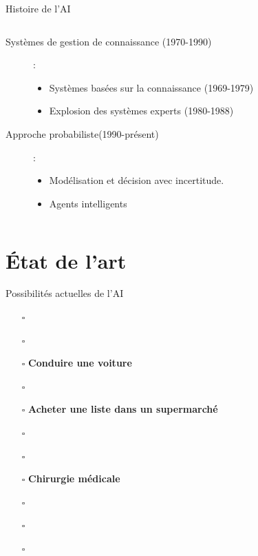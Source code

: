 \documentclass{beamer}
\begin{document}
\begin{frame}[<+->]{Histoire de l'AI}
\begin{columns}
\begin{column}{0.7\textwidth}
{\begin{description}
      \item[\scriptsize Systèmes de gestion de connaissance (1970-1990)]: 
        \begin{itemize}
          \item Systèmes basées sur la connaissance (1969-1979)
          \item Explosion des systèmes experts (1980-1988)
        \end{itemize}
      \item[\scriptsize Approche probabiliste(1990-présent)]:
        \begin{itemize}
          \item Modélisation et décision avec incertitude.
          \item Agents intelligents
        \end{itemize}
    \end{description} 
  }
   \end{column}
 \end{columns}
\end{frame}

\section{État de l'art}%
\label{sec:etat_de_l_art}
\newcommand{\cmark}{\ding{51}}%
\newcommand{\xmark}{\ding{55}}%
\begin{frame}[<+->]{Possibilités actuelles de l'AI}
  
  \begin{itemize}

    \item[$\square$]
  \item[$\square$] 
  \item[$\square$]\alert<4->{\textbf{Conduire une voiture}}
  \item[$\square$]
  \item[$\square$]\alert<6->{\textbf{ Acheter une liste dans un supermarché}}
  \item[$\square$]
  \item[$\square$]
  \item[$\square$]\alert<9->{\textbf{Chirurgie médicale}}
\item[$\square$]
\item[$\square$]
\item[$\square$]
  \end{itemize}
\end{frame}
\end{document}
